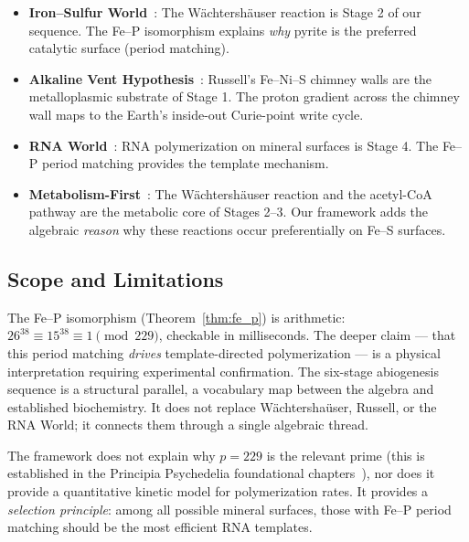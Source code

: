 \begin{itemize}[noitemsep]
    \item \textbf{Iron--Sulfur World}~\cite{Wachtershauser88}: The W\"achtersh\"auser reaction is Stage 2 of our sequence. The Fe--P isomorphism explains \emph{why} pyrite is the preferred catalytic surface (period matching).
    \item \textbf{Alkaline Vent Hypothesis}~\cite{Russell97, Martin03, Lane10}: Russell's Fe--Ni--S chimney walls are the metalloplasmic substrate of Stage 1. The proton gradient across the chimney wall maps to the Earth's inside-out Curie-point write cycle.
    \item \textbf{RNA World}~\cite{Gilbert86}: RNA polymerization on mineral surfaces is Stage 4. The Fe--P period matching provides the template mechanism.
    \item \textbf{Metabolism-First}~\cite{Morowitz92}: The W\"achtersh\"auser reaction and the acetyl-CoA pathway are the metabolic core of Stages 2--3. Our framework adds the algebraic \emph{reason} why these reactions occur preferentially on Fe--S surfaces.
\end{itemize}

\subsection{Scope and Limitations}

The Fe--P isomorphism (Theorem~\ref{thm:fe_p}) is arithmetic: $26^{38} \equiv 15^{38} \equiv 1 \pmod{229}$, checkable in milliseconds. The deeper claim --- that this period matching \emph{drives} template-directed polymerization --- is a physical interpretation requiring experimental confirmation. The six-stage abiogenesis sequence is a structural parallel, a vocabulary map between the algebra and established biochemistry. It does not replace Wächtershaüser, Russell, or the RNA World; it connects them through a single algebraic thread.

The framework does not explain why $p = 229$ is the relevant prime (this is established in the Principia Psychedelia foundational chapters~\cite{LaRue_PP}), nor does it provide a quantitative kinetic model for polymerization rates. It provides a \emph{selection principle}: among all possible mineral surfaces, those with Fe--P period matching should be the most efficient RNA templates.


